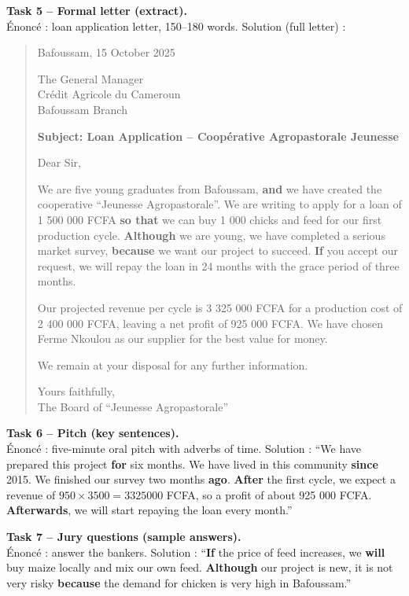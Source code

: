 \documentclass[11pt]{article}
\begin{document}
\begin{exoresolu}
\textbf{Task 5 -- Formal letter (extract).}\\
Énoncé : loan application letter, 150--180 words.
\tcblower
Solution (full letter) :
\begin{quote}
Bafoussam, 15 October 2025

The General Manager\\
Crédit Agricole du Cameroun\\
Bafoussam Branch

\textbf{Subject: Loan Application -- Coopérative Agropastorale Jeunesse}

Dear Sir,

We are five young graduates from Bafoussam, \textbf{and} we have created the cooperative ``Jeunesse Agropastorale''. We are writing to apply for a loan of 1 500 000 FCFA \textbf{so that} we can buy 1 000 chicks and feed for our first production cycle. \textbf{Although} we are young, we have completed a serious market survey, \textbf{because} we want our project to succeed. \textbf{If} you accept our request, we will repay the loan in 24 months with the grace period of three months.

Our projected revenue per cycle is 3 325 000 FCFA for a production cost of 2 400 000 FCFA, leaving a net profit of 925 000 FCFA. We have chosen Ferme Nkoulou as our supplier for the best value for money.

We remain at your disposal for any further information.

Yours faithfully,\\
The Board of ``Jeunesse Agropastorale''
\end{quote}

\textbf{Task 6 -- Pitch (key sentences).}\\
Énoncé : five-minute oral pitch with adverbs of time.
\tcblower
Solution : ``We have prepared this project \textbf{for} six months. We have lived in this community \textbf{since} 2015. We finished our survey two months \textbf{ago}. \textbf{After} the first cycle, we expect a revenue of $950 \times 3500 = \num{3325000}$ FCFA, so a profit of about 925 000 FCFA. \textbf{Afterwards}, we will start repaying the loan every month.''

\textbf{Task 7 -- Jury questions (sample answers).}\\
Énoncé : answer the bankers.
\tcblower
Solution : ``\textbf{If} the price of feed increases, we \textbf{will} buy maize locally and mix our own feed. \textbf{Although} our project is new, it is not very risky \textbf{because} the demand for chicken is very high in Bafoussam.''
\end{exoresolu}
\end{document}

